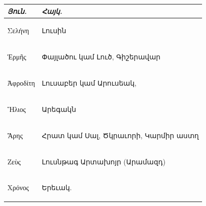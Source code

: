 \documentclass{article}
\begin{document}
\begin{table}[H]
    \centering
    \arm
    \normalsize
    \begin{tabular}{l l}
        \emph{Յուն.}   &  \emph{Հայկ.}                              \\ \hline
         \begin{greek}Σελήνη\end{greek}    &  Լուսին                               \\ 
         \begin{greek}Ἑρμῆς\end{greek}     &  Փայլածու կամ Լուծ, Գիշերավար         \\
         \begin{greek}Ἀφροδίτη\end{greek}  &  Լուսաբեր կամ Արուսեակ,               \\
         \begin{greek}Ἥλιος\end{greek}     &  Արեգակն                              \\
         \begin{greek}Ἄρης\end{greek}      &  Հրատ կամ Սալ, Ծկրաւորի, Կարմիր աստղ  \\
         \begin{greek}Ζεὺς\end{greek}      &  Լուսնթագ Արտախոյր (Արամազդ)          \\
         \begin{greek}Χρόνος\end{greek}    &  Երեւակ. \\
    \end{tabular}
\end{table}
\end{document}
